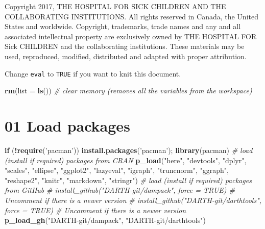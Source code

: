 \documentclass[
]{article}
\newenvironment{Shaded}{\begin{snugshade}}{\end{snugshade}}
\newcommand{\CommentTok}[1]{\textcolor[rgb]{0.56,0.35,0.01}{\textit{#1}}}
\newcommand{\ControlFlowTok}[1]{\textcolor[rgb]{0.13,0.29,0.53}{\textbf{#1}}}
\newcommand{\DataTypeTok}[1]{\textcolor[rgb]{0.13,0.29,0.53}{#1}}
\newcommand{\KeywordTok}[1]{\textcolor[rgb]{0.13,0.29,0.53}{\textbf{#1}}}
\newcommand{\NormalTok}[1]{#1}
\newcommand{\OperatorTok}[1]{\textcolor[rgb]{0.81,0.36,0.00}{\textbf{#1}}}
\newcommand{\StringTok}[1]{\textcolor[rgb]{0.31,0.60,0.02}{#1}}
\begin{document}
Copyright 2017, THE HOSPITAL FOR SICK CHILDREN AND THE COLLABORATING
INSTITUTIONS. All rights reserved in Canada, the United States and
worldwide. Copyright, trademarks, trade names and any and all associated
intellectual property are exclusively owned by THE HOSPITAL FOR Sick
CHILDREN and the collaborating institutions. These materials may be
used, reproduced, modified, distributed and adapted with proper
attribution.

\newpage

Change \texttt{eval} to \texttt{TRUE} if you want to knit this document.

\begin{Shaded}
\begin{Highlighting}[]
\KeywordTok{rm}\NormalTok{(}\DataTypeTok{list =} \KeywordTok{ls}\NormalTok{())      }\CommentTok{# clear memory (removes all the variables from the workspace)}
\end{Highlighting}
\end{Shaded}

\hypertarget{load-packages}{%
\section{01 Load packages}\label{load-packages}}

\begin{Shaded}
\begin{Highlighting}[]
\ControlFlowTok{if}\NormalTok{ (}\OperatorTok{!}\KeywordTok{require}\NormalTok{(}\StringTok{'pacman'}\NormalTok{)) }\KeywordTok{install.packages}\NormalTok{(}\StringTok{'pacman'}\NormalTok{); }\KeywordTok{library}\NormalTok{(pacman) }
\CommentTok{# load (install if required) packages from CRAN}
\KeywordTok{p_load}\NormalTok{(}\StringTok{"here"}\NormalTok{, }\StringTok{"devtools"}\NormalTok{, }\StringTok{"dplyr"}\NormalTok{, }\StringTok{"scales"}\NormalTok{, }\StringTok{"ellipse"}\NormalTok{, }\StringTok{"ggplot2"}\NormalTok{, }\StringTok{"lazyeval"}\NormalTok{, }\StringTok{"igraph"}\NormalTok{, }\StringTok{"truncnorm"}\NormalTok{, }\StringTok{"ggraph"}\NormalTok{, }\StringTok{"reshape2"}\NormalTok{, }\StringTok{"knitr"}\NormalTok{, }\StringTok{"markdown"}\NormalTok{, }\StringTok{"stringr"}\NormalTok{)}
\CommentTok{# load (install if required) packages from GitHub}
\CommentTok{# install_github("DARTH-git/dampack", force = TRUE) # Uncomment if there is a newer version}
\CommentTok{# install_github("DARTH-git/darthtools", force = TRUE) # Uncomment if there is a newer version}
\KeywordTok{p_load_gh}\NormalTok{(}\StringTok{"DARTH-git/dampack"}\NormalTok{, }\StringTok{"DARTH-git/darthtools"}\NormalTok{)}
\end{Highlighting}
\end{Shaded}
\end{document}
